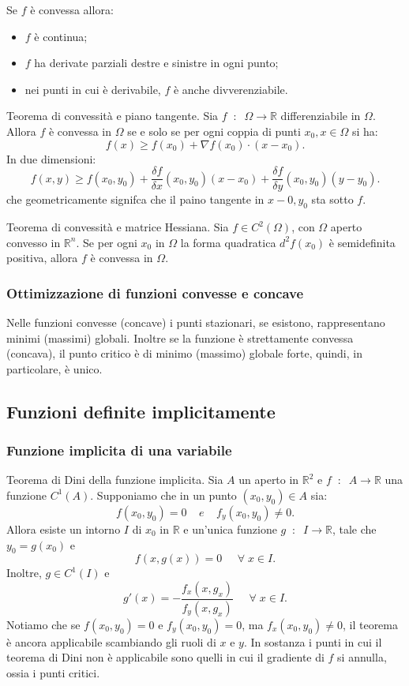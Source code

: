 Se $f$ è convessa allora:
\begin{itemize}
    \item $f$ è continua;
    \item $f$ ha derivate parziali destre e sinistre in ogni punto;
    \item nei punti in cui è derivabile, $f$ è anche divverenziabile.
\end{itemize}

Teorema di convessità e piano tangente. Sia $f \;\;:\;\; \Omega \rightarrow \mathbb{R}$ differenziabile in $\Omega$. Allora $f$ è convessa in $\Omega$ se e solo se per ogni coppia di punti $x_0, x \in \Omega$ si ha:
\[
    f(x) \geq f(x_0) + \nabla f(x_0) \cdot (x-x_0).
\]
In due dimensioni:
\[
    f(x,y) \geq f(x_0,y_0) + \frac{\delta f}{\delta x}(x_0,y_0)(x-x_0)+\frac{\delta f}{\delta y}(x_0, y_0)(y-y_0).
\]
che geometricamente signifca che il paino tangente in $x-0, y_0$ sta sotto $f$.\newline

Teorema di convessità e matrice Hessiana. Sia $f \in C^2(\Omega)$, con $\Omega$ aperto convesso in $\mathbb{R}^n$. Se per ogni $x_0$ in $\Omega$ la forma quadratica $d^2f(x_0)$ è semidefinita positiva, allora $f$ è convessa in $\Omega$.
\subsubsection*{Ottimizzazione di funzioni convesse e concave}
Nelle funzioni convesse (concave) i punti stazionari, se esistono, rappresentano minimi (massimi) globali. Inoltre se la funzione è strettamente convessa (concava), il punto critico è di minimo (massimo) globale forte, quindi, in particolare, è unico.
\subsection*{Funzioni definite implicitamente}
\subsubsection*{Funzione implicita di una variabile}
Teorema di Dini della funzione implicita. Sia $A$ un aperto in $\mathbb{R}^2$ e $f \;\;:\;\; A \rightarrow \mathbb{R}$ una funzione $C^1(A)$. Supponiamo che in un punto $(x_0,y_0) \in A$ sia:
\[
    f(x_0,y_0)= 0 \;\;\;\; e \;\;\;\; f_y(x_0,y_0) \neq 0.
\] 
Allora esiste un intorno $I$ di $x_0$ in $\mathbb{R}$ e un'unica funzione $g \;\;:\;\; I \rightarrow \mathbb{R}$, tale che $y_0=g(x_0)$ e
\[
    f(x,g(x)) = 0 \;\;\;\; \;\forall\;x \in I.
\]
Inoltre, $g \in C^1(I)$ e 
\[
    g'(x) = - \frac{f_x(x,g_x)}{f_y(x,g_x)} \;\;\;\; \;\forall\;x \in I.
\]
Notiamo che se $f(x_0,y_0) = 0$ e $f_y(x_0, y_0) = 0$, ma $f_x(x_0, y_0) \neq 0$, il teorema è ancora applicabile scambiando gli ruoli di $x$ e $y$.\newline
In sostanza i punti in cui il teorema di Dini non è applicabile sono quelli in cui il gradiente di $f$ si annulla, ossia i punti critici.

